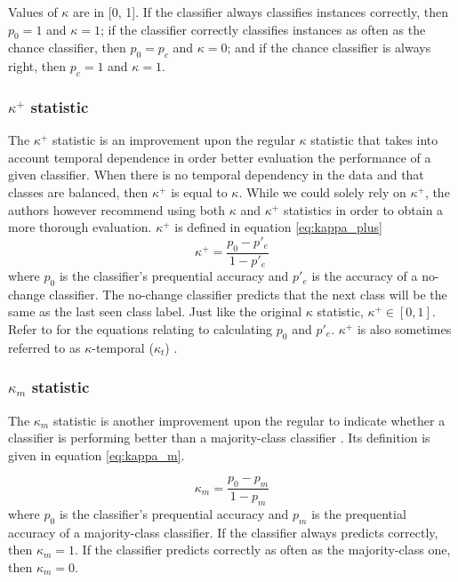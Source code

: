 Values of $\kappa$ are in [0, 1]. If the classifier always classifies instances correctly, then $p_0=1$ and $\kappa=1$; if the classifier correctly classifies instances as often as the chance classifier, then $p_0 = p_c$ and $\kappa=0$; and if the chance classifier is always right, then $p_c=1$ and $\kappa=1$.

\subsubsection{$\kappa^+$ statistic}
The $\kappa^+$ statistic is an improvement upon the regular $\kappa$ statistic that takes into account temporal dependence in order better evaluation the performance of a given classifier. When there is no temporal dependency in the data and that classes are balanced, then $\kappa^+$ is equal to $\kappa$. While we could solely rely on $\kappa^+$, the authors however recommend using both $\kappa$ and $\kappa^+$ statistics in order to obtain a more thorough evaluation.
$\kappa^+$ is defined in equation \ref{eq:kappa_plus}
\begin{equation}
\label{eq:kappa_plus}
\kappa^+=\frac{p_0-p'_e}{1-p'_e}
\end{equation}where $p_0$ is the classifier's prequential accuracy and $p'_e$ is the accuracy of a no-change classifier. The no-change classifier predicts that the next class will be the same as the last seen class label. Just like the original $\kappa$ statistic, $\kappa^+\in [0, 1]$. Refer to \cite{DBLP:conf/pkdd/2013-1} for the equations relating to calculating $p_0$ and $p'_e$. $\kappa^+$ is also sometimes referred to as $\kappa$-temporal ($\kappa_t$) \cite{vzliobaite2015evaluation}.

\subsubsection{$\kappa_m$ statistic}
The $\kappa_m$ statistic is another improvement upon the regular to indicate whether a classifier is performing better than a majority-class classifier \cite{bifet2015efficient}. Its definition is given in equation \ref{eq:kappa_m}.

\begin{equation}
    \label{eq:kappa_m}
    \kappa_m = \frac{p_0-p_m}{1-p_m}
\end{equation}where $p_0$ is the classifier's prequential accuracy and $p_m$ is the prequential accuracy of a majority-class classifier. If the classifier always predicts correctly, then $\kappa_m=1$. If the classifier predicts correctly as often as the majority-class one, then $\kappa_m=0$.

